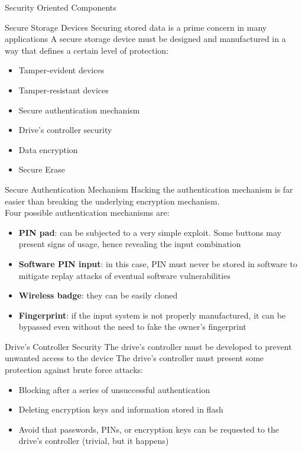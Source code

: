\begin{section}{Security Oriented Components}
  \begin{subsection}{Secure Storage Devices}
    Securing stored data is a prime concern in many applications
    A secure storage device must be designed and manufactured in a way that defines a certain level
    of protection:
    \begin{itemize}
      \item Tamper-evident devices
      \item Tamper-resistant devices
      \item Secure authentication mechanism
      \item Drive’s controller security
      \item Data encryption
      \item Secure Erase
    \end{itemize}
    \begin{subsection}{Secure Authentication Mechanism}
      Hacking the authentication mechanism is far easier than breaking the underlying encryption
      mechanism.\\
      Four possible authentication mechanisms are:
      \begin{itemize}
        \item \textbf{PIN pad}: can be subjected to a very simple exploit. Some buttons may present
          signs of usage, hence revealing the input combination
        \item \textbf{Software PIN input}: in this case, PIN must never be stored in software to
          mitigate replay attacks of eventual software vulnerabilities
        \item \textbf{Wireless badge}: they can be easily cloned
        \item \textbf{Fingerprint}: if the input system is not properly manufactured, it can be
          bypassed even without the need to fake the owner's fingerprint
      \end{itemize}
    \end{subsection}

    \begin{subsection}{Drive’s Controller Security}
      The drive’s controller must be developed to prevent unwanted access to the device
      The drive’s controller must present some protection against brute force attacks:
      \begin{itemize}
        \item Blocking after a series of unsuccessful authentication
        \item Deleting encryption keys and information stored in flash
        \item Avoid that passwords, PINs, or encryption keys can be requested to the drive’s
          controller (trivial, but it happens)
      \end{itemize}
    \end{subsection}


\end{subsection}
\end{section}
